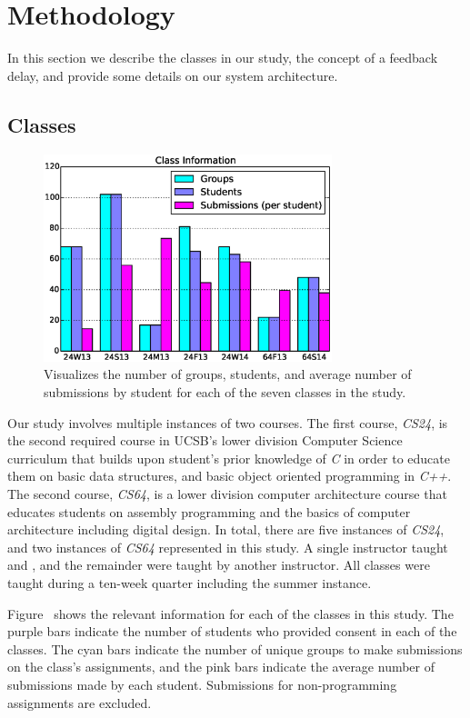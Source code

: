 \section{Methodology} 

In this section we describe the classes in our study, the concept of a feedback
delay, and provide some details on our system architecture.

\subsection{Classes}

\begin{figure}[!t]
\centering \includegraphics[width=3.3in]{graphs/Class_Information.eps}
\caption{Visualizes the number of groups, students, and average number of
  submissions by student for each of the seven classes in the study.}
\end{figure}

Our study involves multiple instances of two courses. The first course,
\emph{CS24}, is the second required course in UCSB's lower division Computer
Science curriculum that builds upon student's prior knowledge of \emph{C} in
order to educate them on basic data structures, and basic object oriented
programming in \emph{C++}. The second course, \emph{CS64}, is a lower division
computer architecture course that educates students on assembly programming and
the basics of computer architecture including digital design. In total, there
are five instances of \emph{CS24}, and two instances of \emph{CS64} represented
in this study. A single instructor taught  and , and the
remainder were taught by another instructor. All classes were taught during a
ten-week quarter including the summer instance.

Figure~ shows the relevant information for each of the
classes in this study. The purple bars indicate the number of students who
provided consent in each of the classes. The cyan bars indicate the number of
unique groups to make submissions on the class's assignments, and the pink bars
indicate the average number of submissions made by each student. Submissions
for non-programming assignments are excluded.

